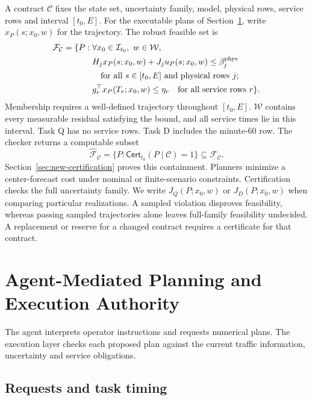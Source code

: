 \documentclass[preprint,12pt]{elsarticle}
\begin{document}
A contract $\mathcal C$ fixes the state set, uncertainty family, model,
physical rows, service rows and interval $[t_0,E]$. For the executable plans
of Section~\ref{sec:new-agent}, write $x_P(s;x_0,w)$ for the trajectory.
The robust feasible set is
\begin{equation}
\begin{aligned}
\mathcal F_{\mathcal C}=\{P:\;&\forall x_0\in\mathcal I_{t_0},\ w\in\mathcal W,\\
&H_jx_P(s;x_0,w)+J_ju_P(s;x_0,w)
                         \le\beta_j^{\rm phys}\\
&\hspace{1em}\text{for all }s\in[t_0,E]\text{ and physical rows }j;\\
&g_r^\top x_P(T_r;x_0,w)\le\eta_r
\quad\text{for all service rows }r\}.
\end{aligned}
\label{eq:benchmark-feasible-set}
\end{equation}
Membership requires a well-defined trajectory throughout $[t_0,E]$.
$\mathcal W$ contains every measurable residual satisfying the bound, and
all service times lie in this interval. Task Q has no service rows.
Task D includes the minute-60 row. The checker returns a computable subset
\begin{equation}
\widehat{\mathcal F}_{\mathcal C}
=\{P:\mathsf{Cert}_{t_0}(P\mid\mathcal C)=1\}
\subseteq\mathcal F_{\mathcal C}.
\label{eq:benchmark-certifiable-set}
\end{equation}
Section~\ref{sec:new-certification} proves this containment. Planners
minimize a center-forecast cost under nominal or finite-scenario
constraints. Certification checks the full uncertainty family. We write
$J_Q(P;x_0,w)$ or $J_D(P;x_0,w)$ when comparing particular realizations.
A sampled violation disproves feasibility, whereas passing sampled
trajectories alone leaves full-family feasibility undecided. A replacement
or reserve for a changed contract requires a certificate for that contract.

\section{Agent-Mediated Planning and Execution Authority}
\label{sec:new-agent}

The agent interprets operator instructions and requests numerical plans.
The execution layer checks each proposed plan against the current traffic
information, uncertainty and service obligations.

\subsection{Requests and task timing}
\label{app:task-state-compiler}
\end{document}
